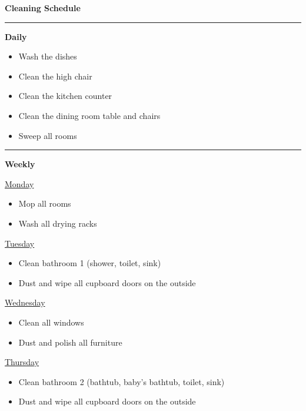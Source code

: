\documentclass[12pt]{extarticle}
\begin{document}
\begin{center}
  \textsf{\textbf{\Large{}Cleaning Schedule}}
\end{center}

\bigskip

\hrule

\bigskip

\textsf{\textbf{\large{}Daily}}

\begin{itemize}
  \item Wash the dishes
  \item Clean the high chair
  \item Clean the kitchen counter
  \item Clean the dining room table and chairs
  \item Sweep all rooms
\end{itemize}

\hrule

\bigskip

\textsf{\textbf{\large{}Weekly}}

\bigskip

\textsf{\underline{Monday}}

\begin{itemize}
  \item Mop all rooms
  \item Wash all drying racks
\end{itemize}

\textsf{\underline{Tuesday}}

\begin{itemize}
  \item Clean bathroom 1 (shower, toilet, sink)
  \item Dust and wipe all cupboard doors on the outside
\end{itemize}

\textsf{\underline{Wednesday}}

\begin{itemize}
  \item Clean all windows
  \item Dust and polish all furniture
\end{itemize}

\textsf{\underline{Thursday}}

\begin{itemize}
  \item Clean bathroom 2 (bathtub, baby's bathtub, toilet, sink)
  \item Dust and wipe all cupboard doors on the outside
\end{itemize}
\end{document}
